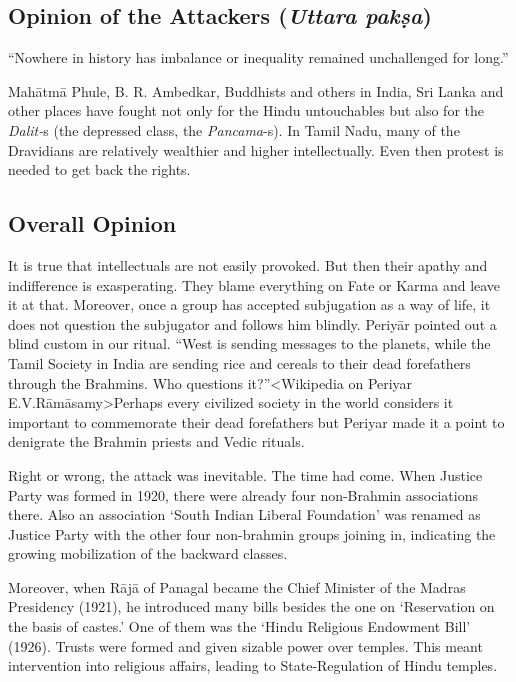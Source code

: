 \subsection*{Opinion of the Attackers (\textit{Uttara pakṣa})}

“Nowhere in history has imbalance or inequality remained unchallenged for long.”

Mahātmā Phule, B. R. Ambedkar, Buddhists and others in India, Sri Lanka and other places have fought not only for the Hindu untouchables but also for the \textit{Dalit-}s (the depressed class, the \textit{Pancama}-s). In Tamil Nadu, many of the Dravidians are relatively wealthier and higher intellectually. Even then protest is needed to get back the rights.


\subsection*{Overall Opinion}

It is true that intellectuals are not easily provoked. But then their apathy and indifference is exasperating. They blame everything on Fate or Karma and leave it at that. Moreover, once a group has accepted subjugation as a way of life, it does not question the subjugator and follows him blindly. Periyār pointed out a blind custom in our ritual. “West is sending messages to the planets, while the Tamil Society in India are sending rice and cereals to their dead forefathers through the Brahmins. Who questions it?”\textless Wikipedia on Periyar E.V.Rāmāsamy\textgreater  Perhaps every civilized society in the world considers it important to commemorate their dead forefathers but Periyar made it a point to denigrate the Brahmin priests and Vedic rituals.

Right or wrong, the attack was inevitable. The time had come. When Justice Party was formed in 1920, there were already four non-Brahmin associations there. Also an association ‘South Indian Liberal Foundation’ was renamed as Justice Party with the other four non-brahmin groups joining in, indicating the growing mobilization of the backward classes.

Moreover, when Rājā of Panagal became the Chief Minister of the Madras Presidency (1921), he introduced many bills besides the one on ‘Reservation on the basis of castes.’ One of them was the ‘Hindu Religious Endowment Bill’ (1926). Trusts were formed and given sizable power over temples. This meant intervention into religious affairs, leading to State-Regulation of Hindu temples.

